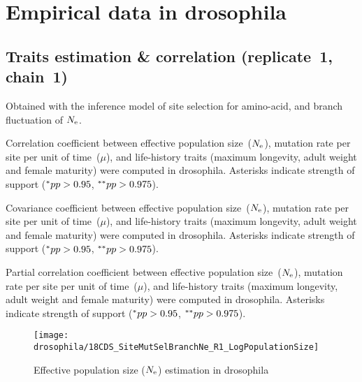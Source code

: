 \section{Empirical data in drosophila}
\label{sec:empirical-data-in-drosophila}

\subsection{Traits estimation \& correlation (replicate~1, chain~1)}
Obtained with the inference model of site selection for amino-acid, and branch fluctuation of $N_{\mathrm{e}}$.

\begin{table}[H]
    
    \caption[Correlation coefficient matrix in drosophila ($\dnds$)]{
    Correlation coefficient between effective population size~($N_{\mathrm{e}}$), mutation rate per site per unit of time~($\mu$), and life-history traits (maximum longevity, adult weight and female maturity) were computed in drosophila.
    Asterisks indicate strength of support ($\smash{^{*}} pp > 0.95$, $\smash{^{**}} pp > 0.975$).}
\end{table}

\begin{table}[H]
    
    \caption[Covariance matrix in drosophila]{
    Covariance coefficient between effective population size~($N_{\mathrm{e}}$), mutation rate per site per unit of time~($\mu$), and life-history traits (maximum longevity, adult weight and female maturity) were computed in drosophila.
    Asterisks indicate strength of support ($\smash{^{*}} pp > 0.95$, $\smash{^{**}} pp > 0.975$).}
\end{table}

\begin{table}[H]
    
    \caption[Partial correlation coefficient matrix in drosophila]{
    Partial correlation coefficient between effective population size~($N_{\mathrm{e}}$), mutation rate per site per unit of time~($\mu$), and life-history traits (maximum longevity, adult weight and female maturity) were computed in drosophila.
    Asterisks indicate strength of support ($\smash{^{*}} pp > 0.95$, $\smash{^{**}} pp > 0.975$).}
\end{table}

\begin{figure}[H]
    \centering
    \texttt{[image: drosophila/18CDS\_SiteMutSelBranchNe\_R1\_LogPopulationSize]}
    \caption[Effective population size estimation in drosophila]{Effective population size ($N_{\mathrm{e}}$) estimation in drosophila}
\end{figure}

